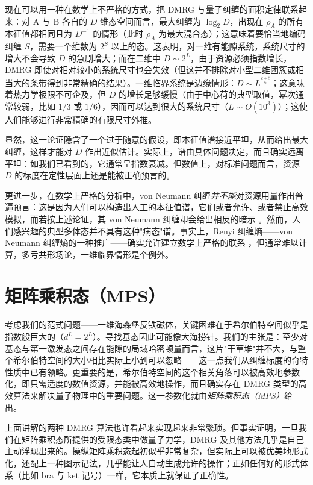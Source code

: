 \documentclass[a4paper,10pt,oneside,onecolumn,1p,times]{elsarticle}
\begin{document}
现在可以用一种在数学上不严格的方式，把 DMRG 与量子纠缠的面积定律联系起来：对 A 与 B 各自的 $D$ 维态空间而言，最大纠缠为 $\log_2 D$，出现在 $\rho_A$ 的所有本征值都相同且为 $D^{-1}$ 的情形（此时 $\rho_A$ 为最大混合态）；这意味着要恰当地编码纠缠 $S$，需要一个维数为 $2^S$ 以上的态。这表明，对一维有能隙系统，系统尺寸的增大不会导致 $D$ 的急剧增大；而在二维中 $D \sim 2^L$，由于资源必须指数增长，DMRG 即使对相对较小的系统尺寸也会失效（但这并不排除对小型二维团簇或相当大的条带得到非常精确的结果）。一维临界系统是边缘情形：$D \sim L^{\frac{c+\overline{c}}{6}}$；这意味着热力学极限不可企及，但 $D$ 的增长足够缓慢（由于中心荷的典型取值，幂次通常较弱，比如 $1/3$ 或 $1/6$），因而可以达到很大的系统尺寸（$L \sim O(10^3)$）；这使人们能够进行非常精确的有限尺寸外推。

显然，这一论证隐含了一个过于随意的假设，即本征值谱接近平坦，从而给出最大纠缠，这样才能对 $D$ 作出近似估计。实际上，谱由具体问题决定，而且确实远离平坦：如我们已看到的，它通常呈指数衰减。但数值上，对标准问题而言，资源 $D$ 的标度在定性层面上还是能被正确预言的。

更进一步，在数学上严格的分析中，von Neumann 纠缠{\em 并不能}对资源用量作出普遍预言：这是因为人们可以构造出人工的本征值谱，它们或者允许、或者禁止高效模拟，而若按上述论证，其 von Neumann 纠缠却会给出相反的暗示 \cite{Schuch08}。然而，人们感兴趣的典型多体态并不具有这种"病态"谱。事实上，Renyi 纠缠熵——von Neumann 纠缠熵的一种推广——确实允许建立数学上严格的联系 \cite{Schuch08}，但通常难以计算，多亏共形场论，一维临界情形是个例外。

\section{矩阵乘积态（MPS）}
\label{sec:matrixproductstates}

考虑我们的范式问题——一维海森堡反铁磁体，关键困难在于希尔伯特空间似乎是指数般巨大的（$d^L = 2^L$）。寻找基态因此可能像大海捞针。我们的主张是：至少对基态与第一激发态之间存在能隙的局域哈密顿量而言，这片"干草堆"并不大，与整个希尔伯特空间的大小相比实际上小到可以忽略——这一点我们从纠缠标度的奇特性质中已有领略。更重要的是，希尔伯特空间的这个相关角落可以被高效地参数化，即只需适度的数值资源，并能被高效地操作，而且确实存在 DMRG 类型的高效算法来解决量子物理中的重要问题。这一参数化就由{\em 矩阵乘积态（MPS）}给出。

上面讲解的两种 DMRG 算法也许看起来实现起来非常繁琐。但事实证明，一旦我们在矩阵乘积态所提供的受限态类中做量子力学，DMRG 及其他方法几乎是自己主动浮现出来的。操纵矩阵乘积态起初似乎非常复杂，但实际上可以被优美地形式化，还配上一种图示记法，几乎能让人自动生成允许的操作；正如任何好的形式体系（比如 bra 与 ket 记号）一样，它本质上就保证了正确性。
\end{document}
